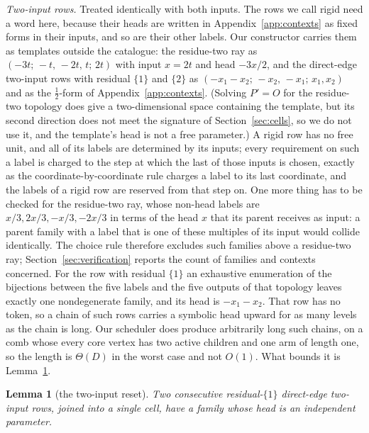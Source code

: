 \documentclass[11pt,a4paper]{article}
\theoremstyle{plain}
\newtheorem{lemma}[theorem]{Lemma}
\theoremstyle{definition}
\theoremstyle{remark}
\begin{document}
\emph{Two-input rows.}  Treated identically with both inputs.  The rows we
call rigid need a word here, because their heads are written in
Appendix~\ref{app:contexts} as fixed forms in their inputs, and so are their
other labels.  Our constructor carries them as templates outside the
catalogue: the residue-two ray as $(-3t;\,-t,\,-2t,\,t;\,2t)$ with input
$x=2t$ and head $-3x/2$, and the direct-edge two-input rows with residual
$\{1\}$ and $\{2\}$ as $(-x_1-x_2;\,-x_2,\,-x_1;\,x_1,x_2)$ and as the
$\tfrac12$-form of Appendix~\ref{app:contexts}.  (Solving $P'=O$ for the
residue-two topology does give a two-dimensional space containing the
template, but its second direction does not meet the signature of
Section~\ref{sec:cells}, so we do not use it, and the template's head is not a
free parameter.)  A rigid row has no free unit, and all of its labels are
determined by its inputs; every requirement on such a label is charged to the
step at which the last of those inputs is chosen, exactly as the
coordinate-by-coordinate rule charges a label to its last coordinate, and the
labels of a rigid row are reserved from that step on.  One more thing has to
be checked for the residue-two ray, whose non-head labels are
$x/3,2x/3,-x/3,-2x/3$ in terms of the head $x$ that its parent receives as
input: a parent family with a label that is one of these multiples of its
input would collide identically.  The choice rule therefore excludes such
families above a residue-two ray; Section~\ref{sec:verification} reports the
count of families and contexts concerned.  For the row with residual $\{1\}$
an exhaustive enumeration of the bijections between the five labels and the
five outputs of that topology leaves exactly one nondegenerate family, and
its head is $-x_1-x_2$.  That row has no token, so a chain of such rows
carries a symbolic head upward for as many levels as the chain is long.  Our scheduler does produce arbitrarily long such
chains, on a comb whose every core vertex has two active children and one arm
of length one, so the length is $\Theta(D)$ in the worst case and not $O(1)$.
What bounds it is Lemma~\ref{lem:reset}.

\begin{lemma}[the two-input reset]\label{lem:reset}
Two consecutive residual-$\{1\}$ direct-edge two-input rows, joined into a
single cell, have a family whose head is an independent parameter.
\end{lemma}
\end{document}
